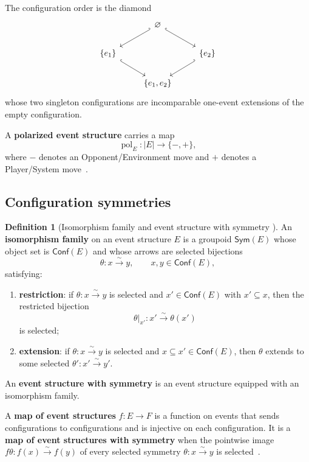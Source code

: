 \documentclass[oneside]{article}
\newcommand{\Conf}{\mathsf{Conf}}
\newcommand{\Sym}{\mathsf{Sym}}
\theoremstyle{plain}
\theoremstyle{definition}
\newtheorem{definition}[theorem]{Definition}
\theoremstyle{remark}
\begin{document}
The configuration order is the diamond
\begin{equation*}
    \begin{tikzcd}
        & \varnothing \arrow[dr,hook] \arrow[dl,hook'] & \\
        \{e_1\} \arrow[dr,hook] && \{e_2\} \arrow[dl,hook'] \\
        &  \{e_1,e_2\}  &
    \end{tikzcd}
\end{equation*}
whose two singleton configurations are incomparable one-event extensions of the empty configuration. 

A \textbf{polarized event structure} carries a map
\[
    \operatorname{pol}_E:|E|\longrightarrow\{-,+\},
\]
where \(-\) denotes an Opponent/Environment move and \(+\) denotes a Player/System move~\cite[Def.~2.3]{CastellanClairambaultWinskel2019}.

\subsection{Configuration symmetries}

\begin{definition}[Isomorphism family and event structure with symmetry
{\cite[Def.~3.1]{CastellanClairambaultWinskel2019}}]
\label{def:cgqg-ess-background}
    An \textbf{isomorphism family} on an event structure \(E\) is a groupoid \(\Sym(E)\) whose object set is \(\Conf(E)\) and whose arrows are selected bijections
    \[
        \theta:x\xrightarrow{\sim}y,
        \qquad x,y\in\Conf(E),
    \]
    satisfying:
    \begin{enumerate}
        \item \textbf{restriction}: if \(\theta:x\xrightarrow{\sim}y\) is selected and
        \(x'\in\Conf(E)\) with \(x'\subseteq x\), then the restricted bijection
        \[
            \theta|_{x'}:x'\xrightarrow{\sim}\theta(x')
        \]
        is selected;
 
        \item \textbf{extension}: if \(\theta:x\xrightarrow{\sim}y\) is selected and \(x\subseteq x'\in\Conf(E)\), then \(\theta\) extends to some selected \(\theta':x'\xrightarrow{\sim}y'\).
    \end{enumerate}
    An \textbf{event structure with symmetry} is an event structure equipped with an isomorphism family.
\end{definition}

A \textbf{map of event structures} \(f:E\to F\) is a function on events that sends configurations to configurations and is injective on each configuration. It is a \textbf{map of event structures with symmetry} when the pointwise image \(f\theta:f(x)\xrightarrow{\sim}f(y)\) of every selected symmetry \(\theta:x\xrightarrow{\sim}y\) is selected~\cite[Defs.~2.6 and 3.6]{CastellanClairambaultWinskel2019}.
\end{document}

